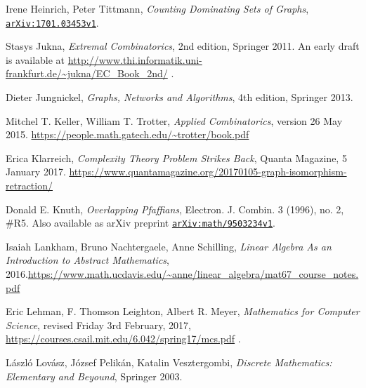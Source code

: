 \documentclass[numbers=enddot,12pt,final,onecolumn,notitlepage]{scrartcl}%
\theoremstyle{definition}
\newcommand\arxiv[1]{\href{http://www.arxiv.org/abs/#1}{\texttt{arXiv:#1}}}
\begin{document}
\begin{thebibliography}{9999999999}
Irene Heinrich, Peter Tittmann,
\textit{Counting Dominating Sets of Graphs},
\arxiv{1701.03453v1}.

Stasys Jukna,
\textit{Extremal Combinatorics}, 2nd edition, Springer 2011.
An early draft is available at
\url{http://www.thi.informatik.uni-frankfurt.de/~jukna/EC_Book_2nd/} .

Dieter Jungnickel,
\textit{Graphs, Networks and Algorithms},
4th edition, Springer 2013.


Mitchel T. Keller, William T. Trotter,
\textit{Applied Combinatorics},
version 26 May 2015.
\newline \url{https://people.math.gatech.edu/~trotter/book.pdf}

Erica Klarreich,
\textit{Complexity Theory Problem Strikes Back},
Quanta Magazine, 5 January 2017.
\newline \url{https://www.quantamagazine.org/20170105-graph-isomorphism-retraction/}

 Donald E. Knuth,
\textit{Overlapping Pfaffians},
Electron. J. Combin. 3 (1996), no. 2, \#R5.
Also available as arXiv preprint \arxiv{math/9503234v1}.


Isaiah Lankham, Bruno Nachtergaele, Anne
Schilling, \textit{Linear Algebra As an Introduction to Abstract Mathematics},
2016.\newline\url{https://www.math.ucdavis.edu/~anne/linear_algebra/mat67_course_notes.pdf}

Eric Lehman, F. Thomson Leighton, Albert R. Meyer,
\textit{Mathematics for Computer Science}, revised Friday 3rd February,
2017, \newline\url{https://courses.csail.mit.edu/6.042/spring17/mcs.pdf} .

L\'aszl\'o Lov\'asz, J\'ozsef Pelik\'an,
Katalin Vesztergombi,
\textit{Discrete Mathematics: Elementary and Beyound},
Springer 2003.


\end{thebibliography}
\end{document}
